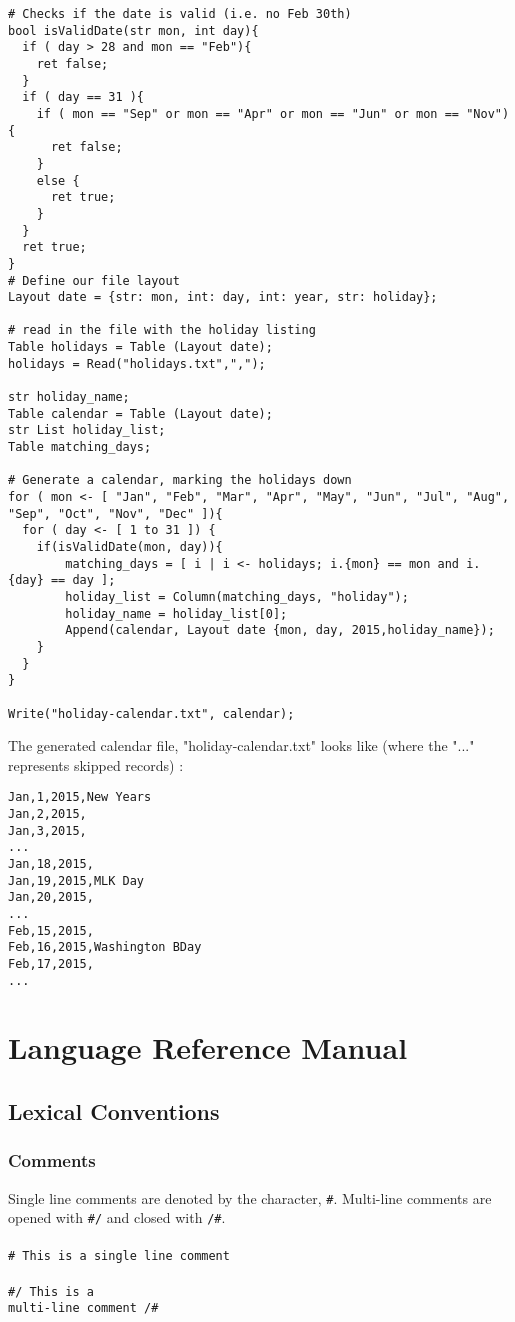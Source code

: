 \documentclass{article}
\begin{document}
\begin{lstlisting}
# Checks if the date is valid (i.e. no Feb 30th)
bool isValidDate(str mon, int day){
  if ( day > 28 and mon == "Feb"){
    ret false;
  }
  if ( day == 31 ){
    if ( mon == "Sep" or mon == "Apr" or mon == "Jun" or mon == "Nov"){
      ret false;
    }
    else {
      ret true;
    }
  }
  ret true;
}
# Define our file layout
Layout date = {str: mon, int: day, int: year, str: holiday};

# read in the file with the holiday listing
Table holidays = Table (Layout date);
holidays = Read("holidays.txt",",");

str holiday_name;
Table calendar = Table (Layout date);
str List holiday_list;
Table matching_days;

# Generate a calendar, marking the holidays down
for ( mon <- [ "Jan", "Feb", "Mar", "Apr", "May", "Jun", "Jul", "Aug", "Sep", "Oct", "Nov", "Dec" ]){
  for ( day <- [ 1 to 31 ]) {
    if(isValidDate(mon, day)){
        matching_days = [ i | i <- holidays; i.{mon} == mon and i.{day} == day ];
        holiday_list = Column(matching_days, "holiday");
        holiday_name = holiday_list[0];
        Append(calendar, Layout date {mon, day, 2015,holiday_name});
    }
  }
}

Write("holiday-calendar.txt", calendar);
\end{lstlisting}
The generated calendar file, "holiday-calendar.txt" looks like (where the "..." represents skipped records) :
\begin{lstlisting}
Jan,1,2015,New Years
Jan,2,2015,
Jan,3,2015,
...
Jan,18,2015,
Jan,19,2015,MLK Day
Jan,20,2015,
...
Feb,15,2015,
Feb,16,2015,Washington BDay
Feb,17,2015,
...
\end{lstlisting}
\section{Language Reference Manual}
\subsection{Lexical Conventions}

\subsubsection{Comments}
Single line comments are denoted by the character, \texttt{\#}. Multi-line comments are opened with \texttt{\#/} and closed with \texttt{/\#}. 
\\
\\
\texttt{\# This is a single line comment}
\\
\\
\texttt{\#/ This is a 
\\
				multi-line comment /\#}
\end{document}
